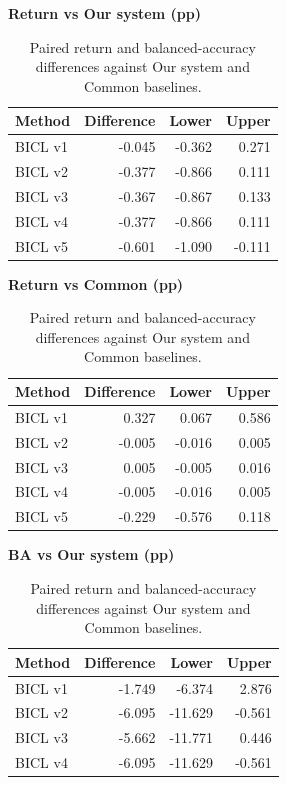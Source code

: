 \begin{table}[htb]
\centering\small
\setlength{\tabcolsep}{3pt}
\renewcommand{\arraystretch}{1.12}
\caption{Paired return and balanced-accuracy differences against Our system and Common baselines.}
\label{tab:u09-contrasts}
\begin{minipage}[t]{0.48\textwidth}
\centering
\textbf{Return vs Our system (pp)}\par\smallskip
\begin{tabular}{lrrr}
\hline
Method & Difference & Lower & Upper \\
\hline
BICL v1 & -0.045 & -0.362 & 0.271 \\
BICL v2 & -0.377 & -0.866 & 0.111 \\
BICL v3 & -0.367 & -0.867 & 0.133 \\
BICL v4 & -0.377 & -0.866 & 0.111 \\
BICL v5 & -0.601 & -1.090 & -0.111 \\
\hline
\end{tabular}
\end{minipage}\hfill
\begin{minipage}[t]{0.48\textwidth}
\centering
\textbf{Return vs Common (pp)}\par\smallskip
\begin{tabular}{lrrr}
\hline
Method & Difference & Lower & Upper \\
\hline
BICL v1 & 0.327 & 0.067 & 0.586 \\
BICL v2 & -0.005 & -0.016 & 0.005 \\
BICL v3 & 0.005 & -0.005 & 0.016 \\
BICL v4 & -0.005 & -0.016 & 0.005 \\
BICL v5 & -0.229 & -0.576 & 0.118 \\
\hline
\end{tabular}
\end{minipage}\par\medskip
\begin{minipage}[t]{0.48\textwidth}
\centering
\textbf{BA vs Our system (pp)}\par\smallskip
\begin{tabular}{lrrr}
\hline
Method & Difference & Lower & Upper \\
\hline
BICL v1 & -1.749 & -6.374 & 2.876 \\
BICL v2 & -6.095 & -11.629 & -0.561 \\
BICL v3 & -5.662 & -11.771 & 0.446 \\
BICL v4 & -6.095 & -11.629 & -0.561 \\

\end{tabular}
\end{minipage}
\end{table}
